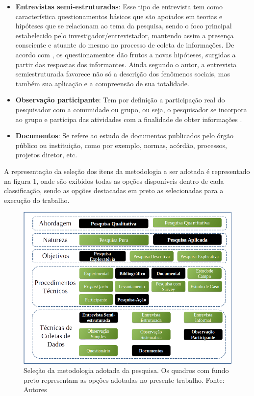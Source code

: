 \begin{itemize}
	\item \textbf{Entrevistas semi-estruturadas}: Esse tipo de entrevista tem  como  característica questionamentos básicos que são apoiados em teorias e hipóteses que se relacionam ao tema da pesquisa, sendo o foco principal estabelecido pelo investigador/entrevistador, mantendo assim a presença consciente e atuante do mesmo no processo de coleta de informações. De acordo com , os questionamentos dão frutos a novas hipóteses, surgidas a partir das respostas dos informantes. Ainda segundo o autor, a entrevista semiestruturada favorece não só a descrição dos fenômenos sociais, mas também sua aplicação e a compreensão de sua totalidade.
	\item \textbf{Observação participante}: Tem por definição a participação real do pesquisador com a comunidade ou grupo, ou seja, o pesquisador se incorpora ao grupo e participa das atividades com a finalidade de obter informações \cite{marconi2010fundamentos}.
	\item \textbf{Documentos}: Se refere ao estudo de documentos publicados pelo órgão público ou instituição, como por exemplo, normas, acórdão, processos, projetos diretor, etc.
\end{itemize}

A representação da seleção dos itens da metodologia a ser adotada é representado na figura 1, onde são exibidos todas as opções disponíveis dentro de cada classificação, sendo as opções destacadas em preto as selecionadas para a execução do trabalho.

\begin{figure}[!htb]
	\centering
	\includegraphics[scale=0.5]{figuras/Metodologia}
	\caption{Seleção da metodologia adotada da pesquisa. Os quadros com fundo preto representam as opções adotadas no presente trabalho. Fonte: Autores}
\end{figure}

